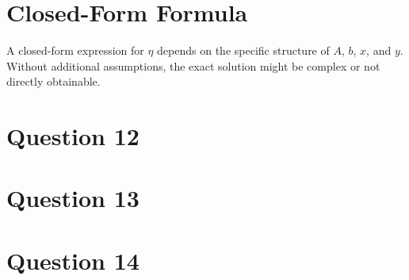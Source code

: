 \documentclass[12p]{article}
\begin{document}
\section*{Closed-Form Formula}
A closed-form expression for \(\eta\) depends on the specific structure of \(A\), \(b\), \(x\), and \(y\). Without additional assumptions, the exact solution might be complex or not directly obtainable.


\section*{Question 12} 

\section*{Question 13} 


\section*{Question 14} 

\newpage
\end{document}
